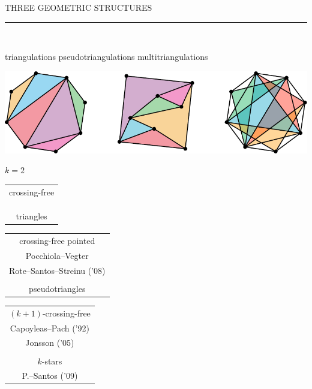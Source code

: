 \documentclass[12pt,titlepage,landscape,a4paper]{article}
\newcommand{\textemoyen}{\fontsize{23}{27}\selectfont}
\newenvironment{slide}[1]
{
\newpage
\begin{center}
{\blue \textemoyen \uppercase{#1}}\\
\end{center}
\vspace{-1cm}
\rule{\textwidth}{0.5 pt}\\
\vspace{-.8cm}
}
{\vspace*{-3cm}}
\newcommand{\violet}{\color{violet}} %
\newcommand{\blue}{\color{blue}} %
\newcommand{\papier}[1]{{\violet\fontsize{15}{20}\selectfont #1}} %
\begin{document}
\begin{slide}{Three geometric structures}

\hspace{1.6cm} triangulations \hspace{3.4cm} pseudotriangulations \hspace{2.5cm} multitriangulations\\
\begin{center}\includegraphics[scale=1.9]{geometricStructures2}\end{center}
\vspace{-1.08cm} \hspace*{25.7cm} ${k=2}$

\hspace{1.7cm} 
\begin{tabular}[t]{c} crossing-free \\ \\[-.3cm] \\ \\ triangles \end{tabular} 
\hspace{3.4cm} 
\begin{tabular}[t]{c} crossing-free pointed \\ \papier{Pocchiola--Vegter} \\[-.3cm] \papier{Rote--Santos--Streinu ('08)} \\ \\ pseudotriangles \end{tabular}
\hspace{2cm} 
\begin{tabular}[t]{c} $(k+1)$-crossing-free \\ \papier{Capoyleas--Pach ('92)} \\[-.3cm] \papier{Jonsson ('05)} \\ \\ $k$-stars \\ \papier{P.--Santos ('09)} \end{tabular}

\end{slide}

\end{document}
